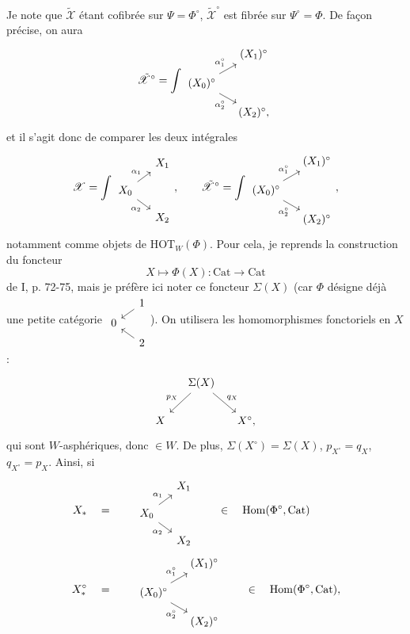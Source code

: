 \documentclass[11pt]{article}
\newcommand{\msp}[1]{\marginpar{\footnotesize [#1]}}
\newcommand{\HOT}{\mathrm{HOT}}
\newcommand{\Cat}{\mathrm{Cat}}
\newcommand{\sX}{\mathscr{X}}
\newcommand{\Hom}{\mathrm{Hom}}
\newcommand{\tsX}{\tilde{\mathscr{X}}}
\begin{document}
Je note que $\tsX$ étant cofibrée sur $\Psi=\Phi^\circ$, $\tsX^\circ$ est fibrée sur $\Psi^\circ=\Phi$. De façon précise, on aura
\[
\tsX^\circ = \int
\begin{tikzcd}[row sep=small, column sep=small]
 & (X_1)^\circ \\
(X_0)^\circ \arrow[ur, "\alpha_1^\circ"] \arrow[dr, "\alpha_2^\circ"'] & \\
 & (X_2)^\circ,
\end{tikzcd}
\]
\msp{page 137}
et il s'agit donc de comparer les deux intégrales
\[
\sX = \int
\begin{tikzcd}[row sep=small, column sep=small]
 & X_1 \\
X_0 \arrow[ur, "\alpha_1"] \arrow[dr, "\alpha_2"'] & \\
 & X_2
\end{tikzcd}
, \qquad
\tsX^\circ = \int
\begin{tikzcd}[row sep=small, column sep=small]
 & (X_1)^\circ \\
(X_0)^\circ \arrow[ur, "\alpha_1^\circ"] \arrow[dr, "\alpha_2^\circ"'] & \\
 & (X_2)^\circ
\end{tikzcd}
,
\]
notamment comme objets de $\HOT_W(\Phi)$. Pour cela, je reprends la construction du foncteur
\[
X \longmapsto \Phi(X) : \Cat \longrightarrow \Cat
\]
de I, p. 72-75, mais je préfère ici noter ce foncteur $\Sigma(X)$ (car $\Phi$ désigne déjà une petite catégorie $\begin{tikzcd}[row sep=tiny, column sep=small]
 & 1 \arrow[dl] \\
0 & \\
 & 2 \arrow[ul]
\end{tikzcd}$). On utilisera les homomorphismes fonctoriels en $X$ :
\[
\begin{tikzcd}[column sep=small]
 & \Sigma(X) \arrow[dl, "p_X"'] \arrow[dr, "q_X"] & \\
X & & X^\circ,
\end{tikzcd}
\]
qui sont $W$-asphériques, donc $\in W$. De plus, $\Sigma(X^\circ)=\Sigma(X)$, $p_{X^\circ}=q_X$, $q_{X^\circ}=p_X$. Ainsi, si
\[
\begin{aligned}
X_* \quad &= \qquad
\begin{tikzcd}[ampersand replacement=\&, row sep=small, column sep=small]
 \& X_1 \\
X_0 \arrow[ur, "\alpha_1"] \arrow[dr, "\alpha_2"'] \& \\
 \& X_2
\end{tikzcd}
\qquad \in \quad \Hom(\Phi^\circ,\Cat)\\
X_*^\circ \quad &= \qquad
\begin{tikzcd}[ampersand replacement=\&, row sep=small, column sep=small]
 \& (X_1)^\circ \\
(X_0)^\circ \arrow[ur, "\alpha_1^\circ"] \arrow[dr, "\alpha_2^\circ"'] \& \\
 \& (X_2)^\circ
\end{tikzcd}
\qquad \in \quad \Hom(\Phi^\circ,\Cat),
\end{aligned}
\]
\end{document}
